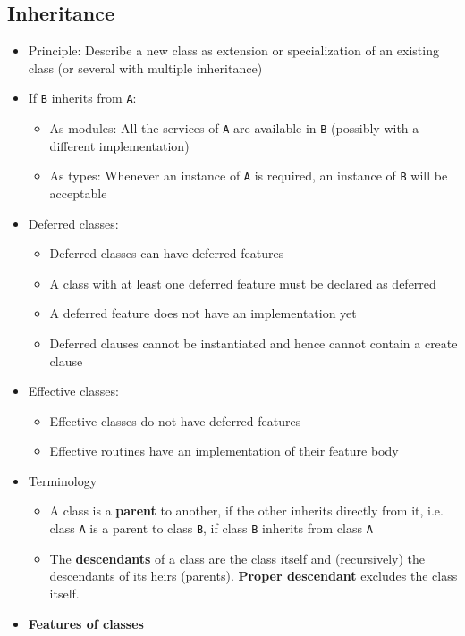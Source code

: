\documentclass[a4paper]{article}
\newcommand{\inline}[1]{\lstinline!#1!}%
\begin{document}
\subsection{Inheritance}
\begin{itemize}
\item Principle: Describe a new class as extension or specialization of an existing class (or several with multiple inheritance)
\item If \inline{B} inherits from \inline{A}:
\begin{itemize}
\item As modules: All the services of \inline{A} are available in \inline{B} (possibly with a different implementation)
\item As types: Whenever an instance of \inline{A} is required, an instance of \inline{B} will be acceptable
\end{itemize}
\item Deferred classes:
\begin{itemize}
\item Deferred classes can have deferred features
\item A class with at least one deferred feature must be declared as deferred
\item A deferred feature does not have an implementation yet
\item Deferred clauses cannot be instantiated and hence cannot contain a create clause
\end{itemize}
\item Effective classes:
\begin{itemize}
\item Effective classes do not have deferred features
\item Effective routines have an implementation of their feature body
\end{itemize}
\item Terminology
\begin{itemize}
\item A class is a \textbf{parent} to another, if the other inherits directly from it, i.e. class \inline{A} is a parent to class \inline{B}, if class \inline{B} inherits from class \inline{A}
\item The \textbf{descendants} of a class are the class itself and (recursively) the descendants of its heirs (parents). \textbf{Proper descendant} excludes the class itself.
\end{itemize}
\item \textbf{Features of classes}

\end{itemize}
\end{document}

